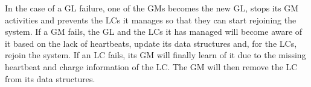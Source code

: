 In the case of a GL failure, one of the GMs becomes the new GL, stops
its GM activities and prevents the LCs it manages so that they can
start rejoining the system. If a GM fails, the GL and the LCs it has
managed will become aware of it based on the lack of heartbeats,
update its data structures and, for the LCs, rejoin the system. If an
LC fails, its GM will finally learn of it due to the missing heartbeat
and charge information of the LC. The GM will then remove the LC from
its data structures.








